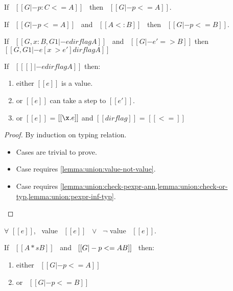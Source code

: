 
\begin{lemma}
\label{lemma:union:check-pexpr-ann}
  If \ $[[G |- p:C <= A]]$ \ then \ $[[G |- p <= A]]$.
\end{lemma}

\begin{lemma}
\label{lemma:union:pexpr-check-sub}
  If \ $[[G |- p <= A]]$ \ and \ $[[A <: B]]$ \ then \ $[[G |- p <= B]]$.
\end{lemma}

\begin{lemma}[Substitution]
\label{lemma:union:substitution}
  If \ $[[G, x:B , G1 |- e dirflag A]]$ \ and \ $[[G |- e' => B]]$
  then \ $[[G, G1 |- e [ x ~> e' ] dirflag A]]$
\end{lemma}

\begin{lemma}[Progress]
\label{lemma:union:progress}
If \ $[[ [] |- e dirflag A]]$ then:
 \begin{enumerate}
  \item either $[[e]]$ is a value.
  \item or $[[e]]$ can take a step to $[[e']]$.
  \item or $[[e]]$ = $[[\x.e]]$ and $[[dirflag]]$ = $[[<=]]$
  \end{enumerate}
\end{lemma}

\begin{proof}
By induction on typing relation.
  \begin{itemize}
    \item Cases  are trivial to prove.
    \item Case  requires \cref{lemma:union:value-not-value}.
    \item Case  requires 
    \cref{lemma:union:check-pexpr-ann,lemma:union:check-or-typ,lemma:union:pexpr-inf-typ}.
  \end{itemize}
\end{proof}

\begin{lemma}
\label{lemma:union:value-not-value}
$\forall$ $[[e]]$, \ value \ $[[e]]$ \ $\vee$ \ $\neg$ value \ $[[e]]$.
\end{lemma}

\begin{lemma}
\label{lemma:union:check-or-typ}
If \ $[[A *s B]]$ \ and \ $[[G |- p <= A \/ B]]$ \ then:
  \begin{enumerate}
    \item either \ $[[G |- p <= A]]$
    \item or \ $[[G |- p <= B]]$
  \end{enumerate}
\end{lemma}

